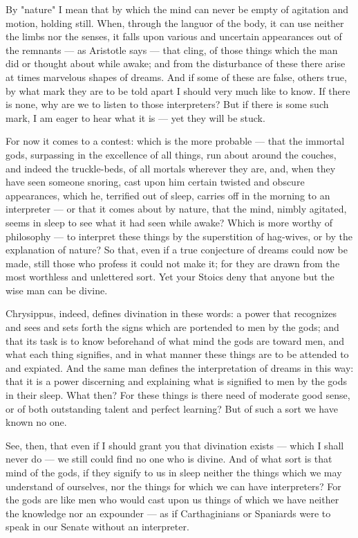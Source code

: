  By "nature" I mean that by which the mind can never be empty of agitation and motion, holding still. When, through the languor of the body, it can use neither the limbs nor the senses, it falls upon various and uncertain appearances out of the remnants — as Aristotle says — that cling, of those things which the man did or thought about while awake; and from the disturbance of these there arise at times marvelous shapes of dreams. And if some of these are false, others true, by what mark they are to be told apart I should very much like to know. If there is none, why are we to listen to those interpreters? But if there is some such mark, I am eager to hear what it is — yet they will be stuck.

 For now it comes to a contest: which is the more probable — that the immortal gods, surpassing in the excellence of all things, run about around the couches, and indeed the truckle-beds, of all mortals wherever they are, and, when they have seen someone snoring, cast upon him certain twisted and obscure appearances, which he, terrified out of sleep, carries off in the morning to an interpreter — or that it comes about by nature, that the mind, nimbly agitated, seems in sleep to see what it had seen while awake? Which is more worthy of philosophy — to interpret these things by the superstition of hag-wives, or by the explanation of nature? So that, even if a true conjecture of dreams could now be made, still those who profess it could not make it; for they are drawn from the most worthless and unlettered sort. Yet your Stoics deny that anyone but the wise man can be divine.

 Chrysippus, indeed, defines divination in these words: a power that recognizes and sees and sets forth the signs which are portended to men by the gods; and that its task is to know beforehand of what mind the gods are toward men, and what each thing signifies, and in what manner these things are to be attended to and expiated. And the same man defines the interpretation of dreams in this way: that it is a power discerning and explaining what is signified to men by the gods in their sleep. What then? For these things is there need of moderate good sense, or of both outstanding talent and perfect learning? But of such a sort we have known no one.

 See, then, that even if I should grant you that divination exists — which I shall never do — we still could find no one who is divine. And of what sort is that mind of the gods, if they signify to us in sleep neither the things which we may understand of ourselves, nor the things for which we can have interpreters? For the gods are like men who would cast upon us things of which we have neither the knowledge nor an expounder — as if Carthaginians or Spaniards were to speak in our Senate without an interpreter.

